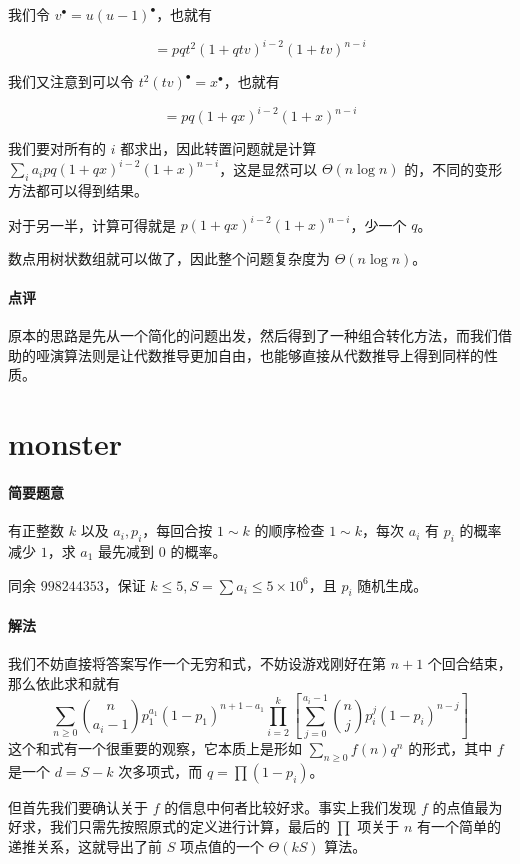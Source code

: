\documentclass[12pt]{ctexart}
\theoremstyle{theorem}
\theoremstyle{theorem}
\begin{document}
我们令 $v^{\bullet}=u(u-1)^{\bullet}$，也就有

$$
= pq t^2 (1+qtv)^{i-2} (1+tv)^{n-i}
$$

我们又注意到可以令 $t^2(tv)^\bullet = x^\bullet$，也就有

$$
= pq (1+qx)^{i-2}(1+x)^{n-i}
$$

我们要对所有的 $i$ 都求出，因此转置问题就是计算 $\sum_i a_i pq (1+qx)^{i-2}(1+x)^{n-i}$，这是显然可以 $\Theta(n\log n)$ 的，不同的变形方法都可以得到结果。

对于另一半，计算可得就是 $p (1+qx)^{i-2}(1+x)^{n-i}$，少一个 $q$。

数点用树状数组就可以做了，因此整个问题复杂度为 $\Theta(n\log n)$。

\paragraph{点评} 原本的思路是先从一个简化的问题出发，然后得到了一种组合转化方法，而我们借助的哑演算法则是让代数推导更加自由，也能够直接从代数推导上得到同样的性质。

\newpage

\section{monster}

\paragraph{简要题意} 有正整数 $k$ 以及 $a_i, p_i$，每回合按 $1\sim k$ 的顺序检查 $1\sim k$，每次 $a_i$ 有 $p_i$ 的概率减少 $1$，求 $a_1$ 最先减到 $0$ 的概率。

同余 $998244353$，保证 $k\le 5, S=\sum a_i \le 5\times 10^6$，且 $p_i$ 随机生成。

\paragraph{解法}

我们不妨直接将答案写作一个无穷和式，不妨设游戏刚好在第 $n+1$ 个回合结束，那么依此求和就有
$$
\sum_{n\ge 0} \binom n{a_i-1} p_1^{a_1} (1-p_1)^{n+1-a_1} \prod_{i=2}^k
\left[\sum_{j=0}^{a_i-1} \binom n j p_i^j(1-p_i)^{n-j}\right]
$$
这个和式有一个很重要的观察，它本质上是形如 $\sum_{n\ge 0} f(n) q^n$ 的形式，其中 $f$ 是一个 $d=S - k$ 次多项式，而 $q = \prod (1-p_i)$。

但首先我们要确认关于 $f$ 的信息中何者比较好求。事实上我们发现 $f$ 的点值最为好求，我们只需先按照原式的定义进行计算，最后的 $\prod$ 项关于 $n$ 有一个简单的递推关系，这就导出了前 $S$ 项点值的一个 $\Theta(kS)$ 算法。
\end{document}
